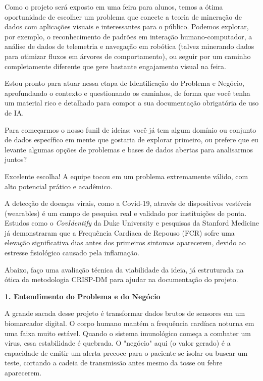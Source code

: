 \begin{description}
    Como o projeto será exposto em uma feira para alunos, temos a ótima oportunidade de escolher um problema que conecte a teoria de mineração de dados com aplicações visuais e interessantes para o público. Podemos explorar, por exemplo, o reconhecimento de padrões em interação humano-computador, a análise de dados de telemetria e navegação em robótica (talvez minerando dados para otimizar fluxos em árvores de comportamento), ou seguir por um caminho completamente diferente que gere bastante engajamento visual na feira.

    Estou pronto para atuar nessa etapa de Identificação do Problema e Negócio, aprofundando o contexto e questionando os caminhos, de forma que você tenha um material rico e detalhado para compor a sua documentação obrigatória de uso de IA.

    Para começarmos o nosso funil de ideias: você já tem algum domínio ou conjunto de dados específico em mente que gostaria de explorar primeiro, ou prefere que eu levante algumas opções de problemas e bases de dados abertas para analisarmos juntos?

    \item[Gemini:] Excelente escolha! A equipe tocou em um problema extremamente válido, com alto potencial prático e acadêmico.

    A detecção de doenças virais, como a Covid-19, através de dispositivos vestíveis (wearables) é um campo de pesquisa real e validado por instituições de ponta. Estudos como o \textit{CovIdentify} da Duke University e pesquisas da Stanford Medicine já demonstraram que a Frequência Cardíaca de Repouso (FCR) sofre uma elevação significativa dias antes dos primeiros sintomas aparecerem, devido ao estresse fisiológico causado pela inflamação.

    Abaixo, faço uma avaliação técnica da viabilidade da ideia, já estruturada na ótica da metodologia CRISP-DM para ajudar na documentação do projeto.

    \textbf{1. Entendimento do Problema e do Negócio}

    A grande sacada desse projeto é transformar dados brutos de sensores em um biomarcador digital.
    O corpo humano mantém a frequência cardíaca noturna em uma faixa muito estável. Quando o sistema imunológico começa a combater um vírus, essa estabilidade é quebrada. O "negócio" aqui (o valor gerado) é a capacidade de emitir um alerta precoce para o paciente se isolar ou buscar um teste, cortando a cadeia de transmissão antes mesmo da tosse ou febre aparecerem.


\end{description}
